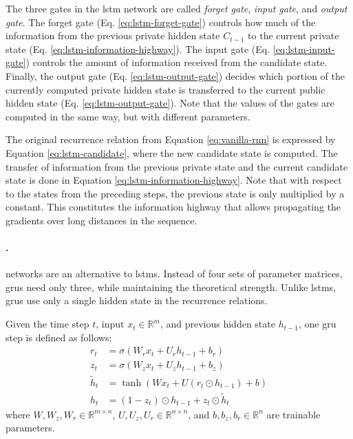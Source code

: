 The three gates in the \gls{lstm} network are called \emph{forget gate},
\emph{input gate}, and \emph{output gate}. The forget gate (Eq.
\ref{eq:lstm-forget-gate}) controls how much of the information from the
previous private hidden state $C_{t-1}$ to the current private state (Eq.
\ref{eq:lstm-information-highway}). The input gate (Eq.
\ref{eq:lstm-input-gate}) controls the amount of information received from the
candidate state. Finally, the output gate (Eq. \ref{eq:lstm-output-gate})
decides which portion of the currently computed private hidden state is
transferred to the current public hidden state
(Eq. \ref{eq:lstm-output-gate}). Note that the values of the gates are computed
in the same way, but with different parameters.

The original recurrence relation from Equation \ref{eq:vanilla-rnn} is expressed
by Equation \ref{eq:lstm-candidate}, where the new candidate state is
computed. The transfer of information from the previous private state and the
current candidate state is done in Equation
\ref{eq:lstm-information-highway}. Note that with respect to the states from the
preceding steps, the previous state is only multiplied by a constant. This
constitutes the information highway that allows propagating the gradients over
long distances in the sequence.

\paragraph{.}  networks \citep{cho2014gru} are
an alternative to \glspl{lstm}. Instead of four sets of parameter matrices,
\glspl{gru} need only three, while maintaining the theoretical strength. Unlike
\glspl{lstm}, \glspl{gru} use only a single hidden state in the recurrence
relations.

Given the time step $t$, input $x_t \in \mathbb{R}^m$, and previous hidden state
$h_{t-1}$, one \gls{gru} step is defined as follows:
%
\begin{align}
  r_t &= \sigma\left(W_r x_t + U_r h_{t-1} + b_r\right) \label{eq:gru-reset-gate} \\
  z_t &= \sigma\left(W_z x_t + U_z h_{t-1} + b_z\right) \label{eq:gru-update-gate} \\
  \tilde{h}_t &= \tanh \left(W x_t + U \left( r_t \odot h_{t-1} \right) + b \right) \label{eq:gru-candidate} \\
  h_t &= (1 - z_t) \odot h_{t-1} + z_t \odot \tilde{h}_t \label{eq:gru-hidden-state}
\end{align}
%
where $W, W_z, W_r \in \mathbb{R}^{m\times n}$,
$U, U_z, U_r \in \mathbb{R}^{n \times n}$, and $b, b_z, b_r \in \mathbb{R}^n$
are trainable parameters.


